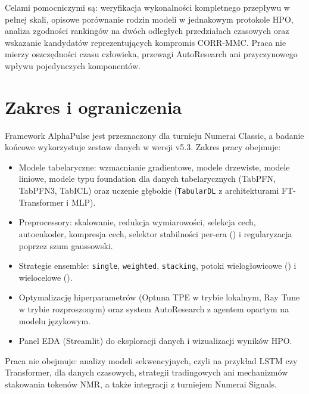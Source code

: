 \documentclass[12pt,a4paper]{report}
\newcommand{\datasetver}{v5.3}
\begin{document}
Celami pomocniczymi są: weryfikacja wykonalności kompletnego przepływu w pełnej skali,
opisowe porównanie rodzin modeli w jednakowym protokole HPO, analiza zgodności
rankingów na dwóch odległych przedziałach czasowych oraz wskazanie kandydatów
reprezentujących kompromis CORR-MMC. Praca nie mierzy oszczędności czasu człowieka,
przewagi AutoResearch ani przyczynowego wpływu pojedynczych komponentów.

\section{Zakres i ograniczenia}
Framework AlphaPulse jest przeznaczony dla turnieju Numerai Classic, a badanie końcowe
wykorzystuje zestaw danych w wersji \datasetver{}. Zakres pracy obejmuje:
\begin{itemize}\item Modele tabelaryczne: wzmacnianie gradientowe, modele drzewiste, modele liniowe,
modele typu foundation dla danych tabelarycznych (TabPFN, TabPFN3, TabICL) oraz uczenie głębokie
(\texttt{TabularDL} z architekturami FT-Transformer i MLP).
\item Preprocessory: skalowanie, redukcja wymiarowości, selekcja cech,
autoenkoder, kompresja cech, selektor stabilności per-era
() i regularyzacja poprzez szum gaussowski.
\item Strategie ensemble: \texttt{single}, \texttt{weighted}, \texttt{stacking},
potoki wielogłowicowe () i wielocelowe
().
\item Optymalizację hiperparametrów (Optuna TPE w trybie lokalnym, Ray Tune w trybie
rozproszonym) oraz system AutoResearch z agentem opartym na modelu językowym.
\item Panel EDA (Streamlit) do eksploracji danych i wizualizacji wyników HPO.\end{itemize}

Praca nie obejmuje: analizy modeli sekwencyjnych, czyli na przykład LSTM czy Transformer,
dla danych czasowych, strategii tradingowych ani mechanizmów stakowania tokenów NMR,
a także integracji z turniejem Numerai Signals.
\end{document}
